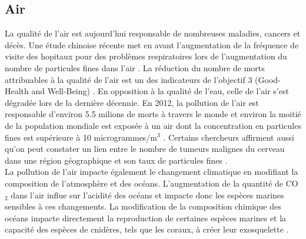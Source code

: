\documentclass[10pt, conference, compsocconf]{llncs}
\begin{document}
		\subsection{Air}
			La qualité de l'air est aujourd'hui responsable de nombreuses maladies, cancers et décès. Une étude chinoise récente met en avant l'augmentation de la fréquence de visite des hopitaux pour des problèmes respiratoires lors de l'augmentation du nombre de particules fines dans l'air \cite{liu_effects_2016}. La réduction du nombre de morts attribuables à la qualité de l'air est un des indicateurs de l'objectif 3 (Good-Health and Well-Being) \cite{united_nations_goal_nodate-5}. En opposition à la qualité de l'eau, celle de l'air s'est dégradée lors de la dernière décennie. En 2012, la pollution de l'air est responsable d'environ 5.5 milions de morts à travers le monde et environ la moitié de la population mondiale est exposée à un air dont la concentration en particules fines est supérieure à 10 microgrammes/m$^{3}$ \cite{yale_university_epi_2016}. Certains chercheurs affirment aussi qu'on peut constater un lien entre le nombre de tumeurs malignes du cerveau dans une région géographique et son taux de particules fines \cite{andersen_long-term_nodate}. \\
			La pollution de l'air impacte également le changement climatique en modifiant la composition de l'atmosphère et des océans. L'augmentation de la quantité de CO$_{2}$ dans l'air influe sur l'acidité des océans et impacte donc les espèces marines sensibles à ces changements. La modification de la composition chimique des océans impacte directement la reproduction de certaines espèces marines et la capacité des espèces de cnidères, tels que les coraux, à créer leur exosquelette \cite{hoegh-guldberg_coral_2007}.  \\
	
		
\end{document}
